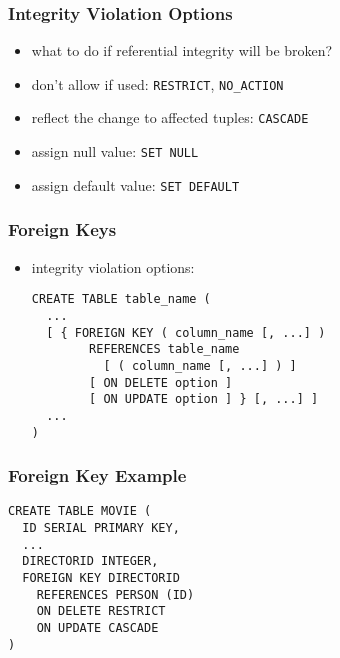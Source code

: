 \documentclass[dvipsnames]{beamer}
\theoremstyle{plain}
\begin{document}
\begin{frame}
  \frametitle{Integrity Violation Options}

  \begin{itemize}
    \item what to do if referential integrity will be broken?

    \medskip
    \item don't allow if used: \texttt{RESTRICT}, \texttt{NO\_ACTION}
    \item reflect the change to affected tuples: \texttt{CASCADE}
    \item assign null value: \texttt{SET NULL}
    \item assign default value: \texttt{SET DEFAULT}
  \end{itemize}
\end{frame}

\begin{frame}[fragile]
  \frametitle{Foreign Keys}

  \begin{itemize}
    \item integrity violation options:
    \begin{lstlisting}
CREATE TABLE table_name (
  ...
  [ { FOREIGN KEY ( column_name [, ...] )
        REFERENCES table_name
          [ ( column_name [, ...] ) ]
        [ ON DELETE option ]
        [ ON UPDATE option ] } [, ...] ]
  ...
)
    \end{lstlisting}
  \end{itemize}
\end{frame}

\begin{frame}[fragile]
  \frametitle{Foreign Key Example}

  \begin{lstlisting}
CREATE TABLE MOVIE (
  ID SERIAL PRIMARY KEY,
  ...
  DIRECTORID INTEGER,
  FOREIGN KEY DIRECTORID
    REFERENCES PERSON (ID)
    ON DELETE RESTRICT
    ON UPDATE CASCADE
)
  \end{lstlisting}
\end{frame}
\end{document}
